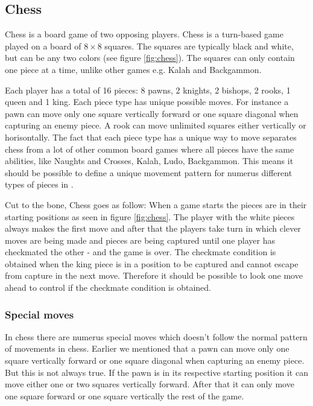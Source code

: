 \subsection{Chess}
Chess is a board game of two opposing players. Chess is a turn-based game played
on a board of $8 \times 8$ squares. The squares are typically black and white,
but can be any two colors (see figure \ref{fig:chess}). The squares can only
contain one piece at a time, unlike other games e.g. Kalah and Backgammon. 

Each player has a total of 16 pieces: 8 pawns, 2 knights, 2 bishops, 2 rooks, 1
queen and 1 king. Each piece type has unique possible moves. For instance a pawn
can move only one square vertically forward or one square diagonal when
capturing an enemy piece. A rook can move unlimited squares either vertically or
horisontally. The fact that each piece type has a unique way to move separates
chess from a lot of other common board games where all pieces have the same
abilities, like Naughts and Crosses, Kalah, Ludo, Backgammon. This means it
should be possible to define a unique movement pattern for numerus different
types of pieces in \productname{}. 

Cut to the bone, Chess goes as follow: When a game starts the pieces are in their
starting positions as seen in figure \ref{fig:chess}. The player with the white
pieces always makes the first move and after that the players take turn in
which clever moves are being made and pieces are being captured until one
player has checkmated the other - and the game is over. The checkmate condition
is obtained when the king piece is in a position to be captured and cannot
escape from capture in the next move. \cite{chessrules} Therefore it should be
possible to look one move ahead to control if the checkmate condition is
obtained.

\subsubsection{Special moves} 
In chess there are numerus special moves which doesn't follow the normal pattern
of movements in chess. Earlier we mentioned that a pawn can move only one square
vertically forward or one square diagonal when capturing an enemy piece. But
this is not always true. If the pawn is in its respective starting position it
can move either one or two squares vertically forward. After that it can only
move one square forward or one square vertically the rest of the game. 

